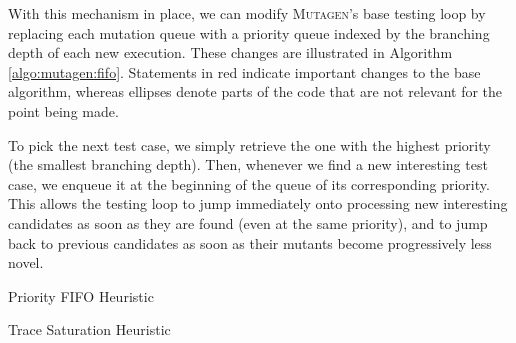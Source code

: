 \documentclass[sigconf, anonymous]{acmart}
\newcommand{\mutagen}{\textsc{Mutagen}\xspace}
\begin{document}
With this mechanism in place, we can modify \mutagen's base testing loop by
replacing each mutation queue with a priority queue indexed by the branching
depth of each new execution.
%
These changes are illustrated in Algorithm \ref{algo:mutagen:fifo}.
%
Statements in {\color{red} red} indicate important changes to the base
algorithm, whereas ellipses denote parts of the code that are not relevant for
the point being made.


To pick the next test case, we simply retrieve the one with the highest priority
(the smallest branching depth).
%
Then, whenever we find a new interesting test case, we enqueue it at the
beginning of the queue of its corresponding priority.
%
This allows the testing loop to jump immediately onto processing new interesting
candidates as soon as they are found (even at the same priority), and to jump
back to previous candidates as soon as their mutants become progressively less
novel.

\begin{algorithm}
  \SetInd{0em}{0.75em}
  \SetAlgoLined
  \DontPrintSemicolon
  \vspace{5pt}

\caption{\label{algo:mutagen:fifo}Priority FIFO Heuristic}
\end{algorithm}

\begin{algorithm}
  \SetInd{0em}{0.75em}
  \SetAlgoLined
  \DontPrintSemicolon

\caption{\label{algo:mutagen:reset}Trace Saturation Heuristic}
\end{algorithm}
\end{document}
